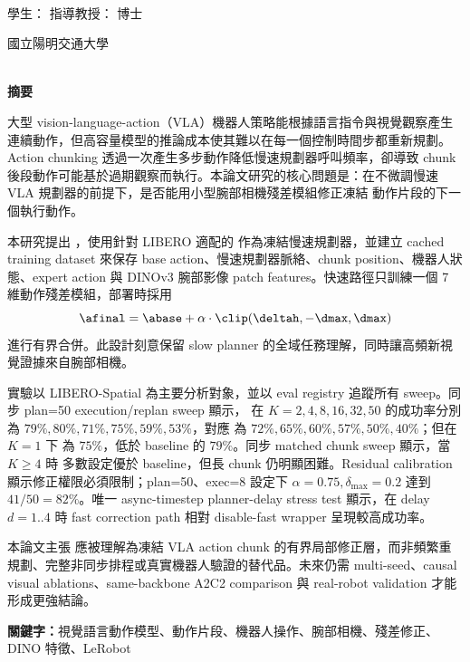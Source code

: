 \begin{center}
    \large
    \begin{singlespace}
        \textbf{\chineseTitle{}} \\[0.5cm]
    \end{singlespace}

    \begin{singlespace}
    學生：\studentCnName  \hspace{2.5cm}  指導教授：\advisorCnName \hspace{0.1cm} 博士 \\
    \end{singlespace}

    \vspace{0.5cm}

    \begin{singlespace}
        國立陽明交通大學\\
        \NameofDepartmentInstituteCN\\[0.2cm]
    \end{singlespace}

    \textbf{摘\hspace{1cm}要} \\[0.5cm]

\end{center}

\normalsize

大型 vision-language-action（VLA）機器人策略能根據語言指令與視覺觀察產生連續動作，但高容量模型的推論成本使其難以在每一個控制時間步都重新規劃。Action chunking 透過一次產生多步動作降低慢速規劃器呼叫頻率，卻導致 chunk 後段動作可能基於過期觀察而執行。本論文研究的核心問題是：在不微調慢速 VLA 規劃器的前提下，是否能用小型腕部相機殘差模組修正凍結 \smolvla{} 動作片段的下一個執行動作。

本研究提出 \method{}，使用針對 LIBERO 適配的 \smolvla{} 作為凍結慢速規劃器，並建立 cached training dataset 來保存 base action、慢速規劃器脈絡、chunk position、機器人狀態、expert action 與 DINOv3 腕部影像 patch features。快速路徑只訓練一個 7 維動作殘差模組，部署時採用
\begin{equation*}
  \afinal = \abase + \alpha \cdot \clip(\deltah, -\dmax, \dmax)
\end{equation*}
進行有界合併。此設計刻意保留 slow planner 的全域任務理解，同時讓高頻新視覺證據來自腕部相機。

實驗以 LIBERO-Spatial 為主要分析對象，並以 eval registry 追蹤所有 sweep。同步 plan=50 execution/replan sweep 顯示，\method{} 在 $K=2,4,8,16,32,50$ 的成功率分別為 $79\%,80\%,71\%,75\%,59\%,53\%$，對應 \smolvla{} 為 $72\%,65\%,60\%,57\%,50\%,40\%$；但在 $K=1$ 下 \method{} 為 $75\%$，低於 baseline 的 $79\%$。同步 matched chunk sweep 顯示，當 $K\geq4$ 時 \method{} 多數設定優於 baseline，但長 chunk 仍明顯困難。Residual calibration 顯示修正權限必須限制；plan=50、exec=8 設定下 $\alpha=0.75,\delta_{\max}=0.2$ 達到 $41/50=82\%$。唯一 async-timestep planner-delay stress test 顯示，在 delay $d=1..4$ 時 fast correction path 相對 disable-fast wrapper 呈現較高成功率。

本論文主張 \method{} 應被理解為凍結 VLA action chunk 的有界局部修正層，而非頻繁重規劃、完整非同步排程或真實機器人驗證的替代品。未來仍需 multi-seed、causal visual ablations、same-backbone A2C2 comparison 與 real-robot validation 才能形成更強結論。

\vspace{1cm}

\textbf{關鍵字：}視覺語言動作模型、動作片段、機器人操作、腕部相機、殘差修正、DINO 特徵、LeRobot
